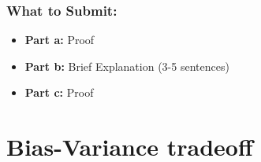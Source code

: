 \documentclass{article}
\begin{document}
\begin{bprob}
    \subsubsection*{What to Submit:}
    \begin{itemize}
        \item \textbf{Part a:} Proof
        \item \textbf{Part b:} Brief Explanation (3-5 sentences)
        \item \textbf{Part c:} Proof
    \end{itemize}
\end{bprob}


\newpage

\section*{Bias-Variance tradeoff}
\end{document}
